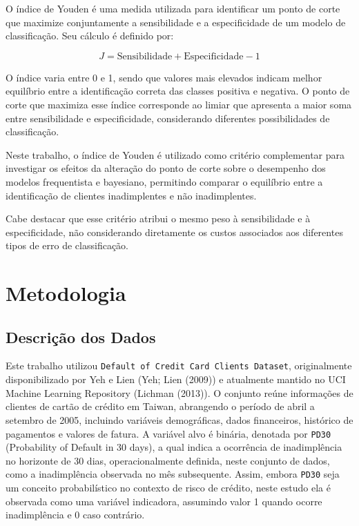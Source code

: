 \documentclass[
  brazilian,
  12pt,
  letterpaper,
  DIV=11,
  numbers=noendperiod]{scrartcl}
\begin{document}
O índice de Youden é uma medida utilizada para identificar um ponto de
corte que maximize conjuntamente a sensibilidade e a especificidade de
um modelo de classificação. Seu cálculo é definido por:

\[
J = \text{Sensibilidade} + \text{Especificidade} - 1
\]

O índice varia entre 0 e 1, sendo que valores mais elevados indicam
melhor equilíbrio entre a identificação correta das classes positiva e
negativa. O ponto de corte que maximiza esse índice corresponde ao
limiar que apresenta a maior soma entre sensibilidade e especificidade,
considerando diferentes possibilidades de classificação.

Neste trabalho, o índice de Youden é utilizado como critério
complementar para investigar os efeitos da alteração do ponto de corte
sobre o desempenho dos modelos frequentista e bayesiano, permitindo
comparar o equilíbrio entre a identificação de clientes inadimplentes e
não inadimplentes.

Cabe destacar que esse critério atribui o mesmo peso à sensibilidade e à
especificidade, não considerando diretamente os custos associados aos
diferentes tipos de erro de classificação.

\section{Metodologia}\label{metodologia}

\subsection{Descrição dos Dados}\label{descriuxe7uxe3o-dos-dados}

Este trabalho utilizou
\texttt{Default\ of\ Credit\ Card\ Clients\ Dataset}, originalmente
disponibilizado por Yeh e Lien (Yeh; Lien (2009)) e atualmente mantido
no UCI Machine Learning Repository (Lichman (2013)). O conjunto reúne
informações de clientes de cartão de crédito em Taiwan, abrangendo o
período de abril a setembro de 2005, incluindo variáveis demográficas,
dados financeiros, histórico de pagamentos e valores de fatura. A
variável alvo é binária, denotada por \texttt{PD30} (Probability of
Default in 30 days), a qual indica a ocorrência de inadimplência no
horizonte de 30 dias, operacionalmente definida, neste conjunto de
dados, como a inadimplência observada no mês subsequente. Assim, embora
\texttt{PD30} seja um conceito probabilístico no contexto de risco de
crédito, neste estudo ela é observada como uma variável indicadora,
assumindo valor 1 quando ocorre inadimplência e 0 caso contrário.
\end{document}
